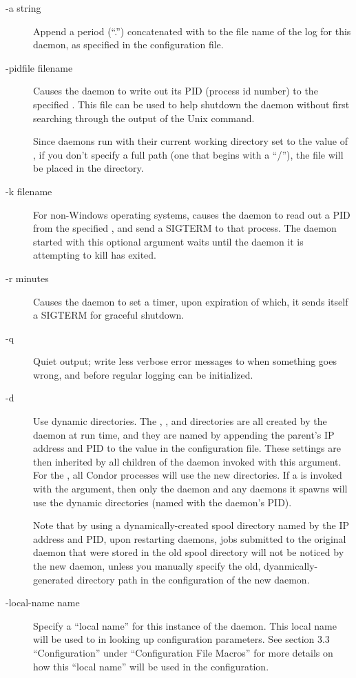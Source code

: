 \begin{description}
\item[-a string] Append a period (``.'') concatenated with 
  to the file name of the log for this daemon,
  as specified in the configuration file.

\item[-pidfile filename] Causes the daemon to write out its PID
  (process id number) to the specified .
  This file can be used to
  help shutdown the daemon without first searching through 
  the output of the Unix  command.

  Since daemons run with their current working directory set to the
  value of , if you don't specify a full path
  (one that begins with a ``/''),
  the file will be placed in the  directory.

\item[-k filename] For non-Windows operating systems,
  causes the daemon to read out a PID from the
  specified , and send a SIGTERM to that process.
  The daemon started with this optional argument waits until the
  daemon it is attempting to kill has exited.  

\item[-r minutes] Causes the daemon to set a timer, upon expiration
  of which, it sends itself a SIGTERM for graceful shutdown.

\item[-q] Quiet output; write less verbose error
 messages to  when something goes wrong,
 and before regular logging can be initialized.

\item[-d] Use dynamic directories.
 The , , and  directories
 are all created by the daemon at run time,
 and they are named by appending the
 parent's IP address and PID to the value in the 
 configuration file.
 These settings are then inherited by all children of the daemon
 invoked with this  argument.
 For the ,
 all Condor processes will use the new directories.
 If a  is invoked with the  argument,
 then only the  daemon and any
  daemons it spawns will use the dynamic
 directories (named with the  daemon's PID).

 Note that by using a dynamically-created spool directory
 named by the IP address and PID,
 upon restarting daemons,
 jobs submitted to the original  daemon
 that were stored in the old spool directory will not be noticed
 by the new  daemon,
 unless you manually specify the old, dyanmically-generated 
  directory path in the configuration of the
 new  daemon.

\item[-local-name name] Specify a ``local name'' for this instance of
  the daemon.  This local name will be used to in looking up
  configuration parameters.  See section 3.3 ``Configuration'' under
  ``Configuration File Macros'' for more details on how this ``local
  name'' will be used in the configuration.

\end{description}

